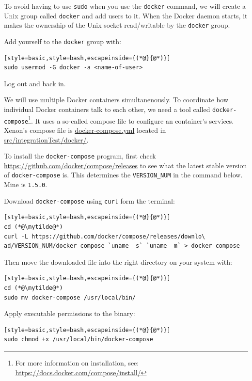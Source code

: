 \documentclass[12pt, a4paper, twoside,openany,titlepage]{article}
\begin{document}
{To avoid having to use \texttt{sudo} when you use the \texttt{docker} command, we will create a Unix group called \texttt{docker} and add users to it. When the Docker daemon starts, it makes the ownership of the Unix socket read/writable by the \texttt{docker} group.

Add yourself to the \texttt{docker} group with:
\begin{lstlisting}[style=basic,style=bash,escapeinside={(*@}{@*)}]
sudo usermod -G docker -a <name-of-user>
\end{lstlisting}
Log out and back in.

We will use multiple Docker containers simultanenously. To coordinate how individual Docker containers talk to each other, we need a tool called \texttt{docker-compose}\footnote{For more information on installation, see: \url{https://docs.docker.com/compose/install/}}. It uses
a so-called compose file to configure an container's services. Xenon's compose file is \url{docker-compose.yml} located in \url{src/integrationTest/docker/}.

To install the \texttt{docker-compose} program, first check \url{https://github.com/docker/compose/releases} to see what the latest stable version of \texttt{docker-compose} is. This determines the \texttt{VERSION\_NUM} in the command below. Mine is \texttt{1.5.0}.

Download \texttt{docker-compose} using \texttt{curl} form the terminal:
\begin{lstlisting}[style=basic,style=bash,escapeinside={(*@}{@*)}]
cd (*@\mytilde@*)
curl -L https://github.com/docker/compose/releases/downlo\
ad/VERSION_NUM/docker-compose-`uname -s`-`uname -m` > docker-compose
\end{lstlisting}

Then move the downloaded file into the right directory on your system with:
\begin{lstlisting}[style=basic,style=bash,escapeinside={(*@}{@*)}]
cd (*@\mytilde@*)
sudo mv docker-compose /usr/local/bin/
\end{lstlisting}

Apply executable permissions to the binary:
\begin{lstlisting}[style=basic,style=bash,escapeinside={(*@}{@*)}]
sudo chmod +x /usr/local/bin/docker-compose
\end{lstlisting}

}
\end{document}

